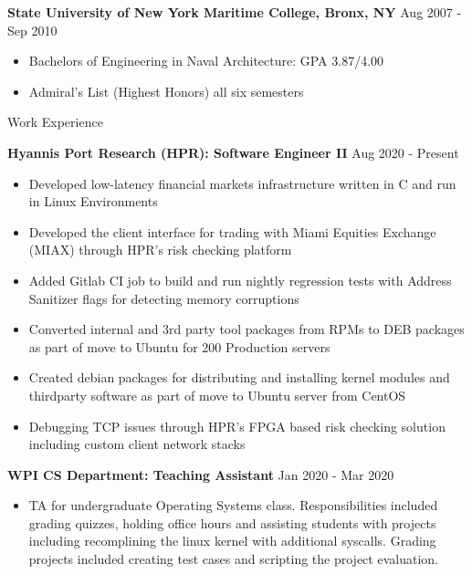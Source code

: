 \documentclass[10pt,a4paper]{article}
\begin{document}
{\begin{tcolorbox}
      \large{\textbf{State University of New York Maritime College, Bronx, NY}}
      \hfill
      \large{Aug 2007 - Sep 2010}
      \begin{itemize}[noitemsep]
        \item Bachelors of Engineering in Naval Architecture: GPA 3.87/4.00
        \item Admiral's List (Highest Honors) all six semesters
      \end{itemize}
\end{tcolorbox}

\begin{tcolorbox}

  {\selectfont
    \begin{center}
      \LARGE{Work Experience}
    \end{center}
  }

  \tcblower

  \large{\textbf{Hyannis Port Research (HPR): Software Engineer II}}
  \hfill
  \large{Aug 2020 - Present}
  \begin{itemize}[noitemsep]
    \item Developed low-latency financial markets infrastructure written in C and run in Linux Environments
    \item Developed the client interface for trading with Miami Equities Exchange (MIAX) through HPR's risk checking platform
    \item Added Gitlab CI job to build and run nightly regression tests with Address Sanitizer flags for detecting memory corruptions
    \item Converted internal and 3rd party tool packages from RPMs to DEB packages as part of move to Ubuntu for 200 Production servers
    \item Created debian packages for distributing and installing kernel modules and thirdparty software as part of move to Ubuntu server from CentOS
    \item Debugging TCP issues through HPR's FPGA based risk checking solution including custom client network stacks
  \end{itemize}

  \large{\textbf{WPI CS Department: Teaching Assistant}}
  \hfill
  \large{Jan 2020 - Mar 2020}
  \begin{itemize}[noitemsep]
    \item TA for undergraduate Operating Systems class. Responsibilities included grading quizzes, holding office hours and assisting students with projects including recomplining the linux kernel with additional syscalls. Grading projects included creating test cases and scripting the project evaluation.
  \end{itemize}


\end{tcolorbox}}
\end{document}
